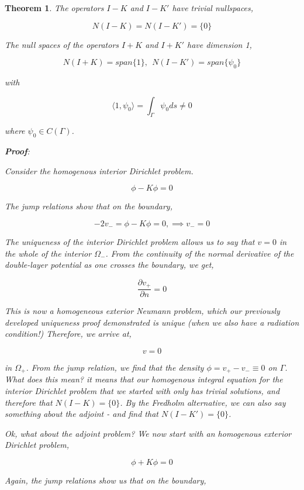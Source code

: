 \documentclass[12pt, a4, twoside]{article}
\newtheorem{theorem}{Theorem}[section]
\begin{document}
\begin{theorem}
    The operators $I-K$ and $I-K'$ have trivial nullspaces,

    $$N(I-K)=N(I-K') = \{ 0 \}$$

    The null spaces of the operators $I+K$ and $I+K'$ have dimension 1,

    $$N(I+K) = span \{ 1 \}, \> \>  N(I-K') = span \{ \psi_0 \}$$

    with 

    $$ \langle 1, \psi_0 \rangle = \int_\Gamma \psi_0 ds \neq 0 $$
    
    where $\psi_0 \in C(\Gamma)$.

    \hspace{0.7pt}

    \textbf{Proof}:

    Consider the homogenous interior Dirichlet problem.

    $$ \phi - K \phi = 0$$

    The jump relations show that on the boundary,

    $$-2v_- = \phi-K\phi = 0, \implies v_- = 0$$ 

    The uniqueness of the interior Dirichlet problem allows us to say that $v = 0$ in the whole of the interior $\Omega_-$. From the continuity of the normal derivative of the double-layer potential as one crosses the boundary, we get,

    $$\frac{\partial v_+}{\partial n} = 0$$

    This is now a homogeneous exterior Neumann problem, which our previously developed uniqueness proof demonstrated is unique (when we also have a radiation condition!) Therefore, we arrive at,

    $$ v = 0$$

    in $\Omega_+$. From the jump relation, we find that the density $\phi = v_+ - v_- \equiv 0$ on $\Gamma$. What does this mean? it means that our homogenous integral equation for the interior Dirichlet problem that we started with \textit{only} has trivial solutions, and therefore that $N(I-K) = \{ 0 \}$. By the Fredholm alternative, we can also say something about the adjoint - and find that $N(I-K') = \{ 0 \}$.

    Ok, what about the adjoint problem? We now start with an homogenous exterior Dirichlet problem,

    $$\phi + K\phi = 0$$

    Again, the jump relations show us that on the boundary,


\end{theorem}
\end{document}
